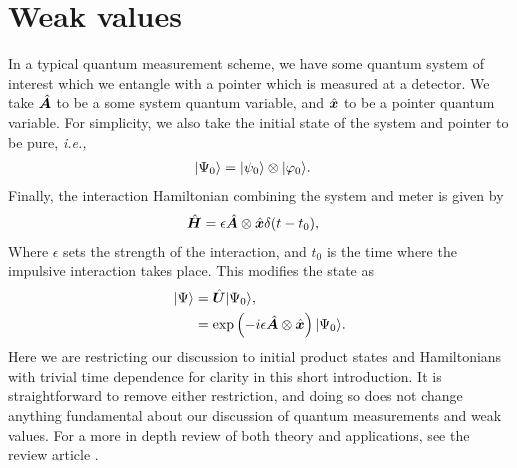 \section{Weak values}
In a typical quantum measurement scheme, we have some quantum system of interest which we entangle with a pointer which is measured at a detector.  We take $\hat{\bm A}$ to be a some system quantum variable, and $\hat{\bm x}$ to be a pointer quantum variable.  For simplicity, we also take the initial state of the system and pointer to be pure, \emph{i.e.,}
\begin{align}
  \lvert \Psi_0\rangle &= \lvert \psi_0\rangle \otimes \lvert \varphi_0\rangle.
\end{align}
Finally, the interaction Hamiltonian combining the system and meter is given by
\begin{align}
  \hat{\bm H} &= \epsilon \hat{\bm A} \otimes \hat{\bm x} \delta{(t - t_0)},
\end{align}
Where $\epsilon$ sets the strength of the interaction, and $t_0$ is the time where the impulsive interaction takes place.  This modifies the state as
\begin{align}
\nonumber  \lvert \Psi\rangle &= \hat{\bm U}\lvert \Psi_0\rangle, \\
                      &= \exp\left(-i\epsilon \hat{\bm A} \otimes \hat{\bm x} \right) \lvert \Psi_0\rangle.
\end{align}
Here we are restricting our discussion to initial product states and Hamiltonians with trivial time dependence for clarity in this short introduction.  It is straightforward to remove either restriction, and doing so does not change anything fundamental about our discussion of quantum measurements and weak values.  For a more in depth review of both theory and applications, see the review article \cite{Dressel2014}.

